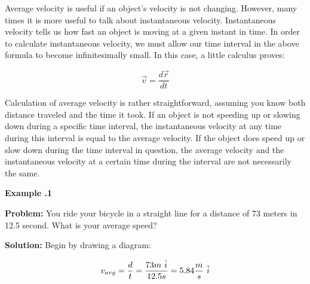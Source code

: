 Average velocity is useful if an object's velocity is not changing.  However, many times it is more useful to talk about instantaneous velocity.  Instantaneous velocity tells us how fast an object is moving at a given instant in time.  In order to calculate instantaneous velocity, we must allow our time interval in the above formula to become infinitesimally small.  In this case, a little calculus proves:
\begin{mdframed}[backgroundcolor=orange!20!white]
	\begin{equation}
	\vec{v} = \frac{d\vec{r}}{dt}
	\label{equation:instantaneousvelocity}
	\end{equation}
\end{mdframed}	
	
	Calculation of average velocity is rather straightforward, assuming you know both distance traveled and the time it took.  If an object is not speeding up or slowing down during a specific time interval, the instantaneous velocity at any time during this interval is equal to the average velocity.  If the object does speed up or slow down during the time interval in question, the average velocity and the instantaneous velocity at a certain time during the interval are not necessarily the same. 
	
\begin{mdframed}[backgroundcolor=blue!10!white]
		\begin{center}


		\textbf{Example \thesection.1}	
	\end{center}

\textbf{Problem: }You ride your bicycle in a straight line for a distance of 73 meters in 12.5 second.  What is your average speed?
\vspace{0.1in}

\textbf{Solution:} 
Begin by drawing a diagram:


\begin{equation*}
 v_{avg}  = \frac{d}{t} = \frac{73m \hspace{0.05in} \hat{i}}{12.5s}  = 5.84 \frac{m}{s} \hspace{0.05in} \hat{i}
\end{equation*}

\end{mdframed}
	\vspace{0.1in}
	
